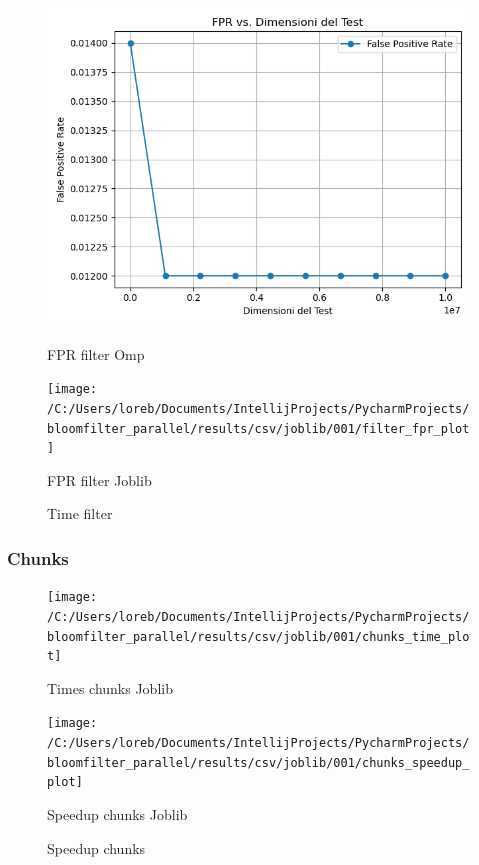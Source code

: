 \documentclass[11pt]{article}
\begin{document}
    \begin{figure}[H]
        \centering
        \includegraphics[width=\linewidth]{omp/001/filter_fpr_plot}
            \caption{FPR filter Omp}\label{fig:filter_fpr_omp}
        \endminipage\hfill
        \texttt{[image: /C:/Users/loreb/Documents/IntellijProjects/PycharmProjects/bloomfilter\_parallel/results/csv/joblib/001/filter\_fpr\_plot]}
            \caption{FPR filter Joblib}\label{fig:filter_fpr_joblib}
        \endminipage\hfill
        \caption{Time filter}
    \end{figure}

    \subsubsection{Chunks}\label{subsubsec:chunks}
    \begin{figure}[H]
        \centering
        \texttt{[image: /C:/Users/loreb/Documents/IntellijProjects/PycharmProjects/bloomfilter\_parallel/results/csv/joblib/001/chunks\_time\_plot]}
            \caption{Times chunks Joblib}\label{fig:chunks_time_joblib}
        \endminipage\hfill
        \texttt{[image: /C:/Users/loreb/Documents/IntellijProjects/PycharmProjects/bloomfilter\_parallel/results/csv/joblib/001/chunks\_speedup\_plot]}
            \caption{Speedup chunks Joblib}\label{fig:chunks_speedup_joblib}
        \endminipage\hfill
        \caption{Speedup chunks}
    \end{figure}
\end{document}
